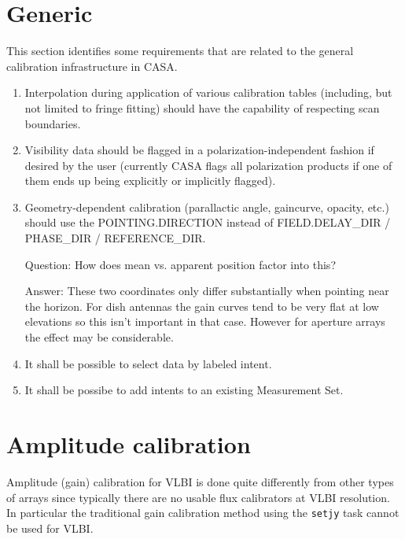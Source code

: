 \documentclass[11pt,a4paper]{article}
\begin{document}
\section{Generic}

This section identifies some requirements that are related to the
general calibration infrastructure in CASA.

\begin{enumerate}[seclist]

\item Interpolation during application of various calibration tables
  (including, but not limited to fringe fitting) should have the
  capability of respecting scan boundaries.

\item Visibility data should be flagged in a polarization-independent
  fashion if desired by the user (currently CASA flags all
  polarization products if one of them ends up being explicitly or
  implicitly flagged).

\item Geometry-dependent calibration (parallactic angle, gaincurve,
  opacity, etc.) should use the POINTING.DIRECTION instead of
  FIELD.DELAY{\_}DIR / PHASE{\_}DIR / REFERENCE{\_}DIR.

  Question: How does mean vs. apparent position factor into this?

  Answer: These two coordinates only differ substantially when
  pointing near the horizon.  For dish antennas the gain curves tend
  to be very flat at low elevations so this isn't important in that
  case.  However for aperture arrays the effect may be considerable.

\item It shall be possible to select data by labeled intent.

\item It shall be possibe to add intents to an existing Measurement Set.
  
\end{enumerate}


\section{Amplitude calibration}

Amplitude (gain) calibration for VLBI is done quite differently from
other types of arrays since typically there are no usable flux
calibrators at VLBI resolution.  In particular the traditional gain
calibration method using the \texttt{setjy} task cannot be used for
VLBI.
\end{document}
